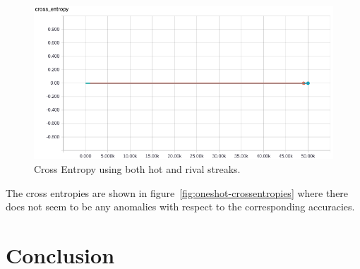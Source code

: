 \documentclass{article} %
\begin{document}
\begin{figure}[!htb]
\endminipage
{}%
  \includegraphics[width=\linewidth]{plots/model1/oneshot/streak-hr/crossentropy.png}
  \caption{Cross Entropy using both hot and rival streaks.}\label{fig:oneshot-hr-crossentropy}
\endminipage
\end{figure}
\label{fig:oneshot-crossentropies}

The cross entropies are shown in figure~\ref{fig:oneshot-crossentropies} where there does not seem to be any anomalies with respect to the corresponding accuracies.


\section{Conclusion}
\label{sec:conclusion}


\small{
\nocite{*}


}
\end{document}
